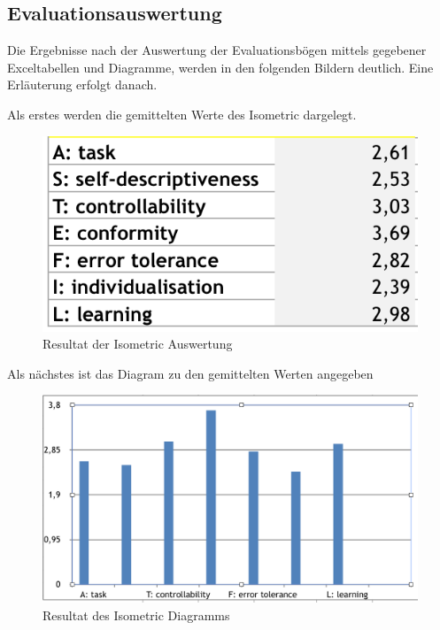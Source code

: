 \documentclass[runningheads,a4paper, 12pt]{llncs}
\begin{document}
\subsection{Evaluationsauswertung}
Die Ergebnisse nach der Auswertung der Evaluationsbögen mittels gegebener Exceltabellen und Diagramme, werden in den folgenden Bildern deutlich. Eine Erläuterung erfolgt danach.

Als erstes werden die gemittelten Werte des Isometric dargelegt.
\begin{figure}[H]
	\centering
	\includegraphics[angle=0,scale=1]{iso_metric_result}
	\caption{Resultat der Isometric Auswertung}
	\label{fig:result1}
\end{figure}

Als nächstes ist das Diagram zu den gemittelten Werten angegeben
\begin{figure}[H]
	\centering
	\includegraphics[angle=0,scale=0.6]{iso_metric_diagram}
	\caption{Resultat des Isometric Diagramms}
	\label{fig:result2}
\end{figure}
\end{document}

